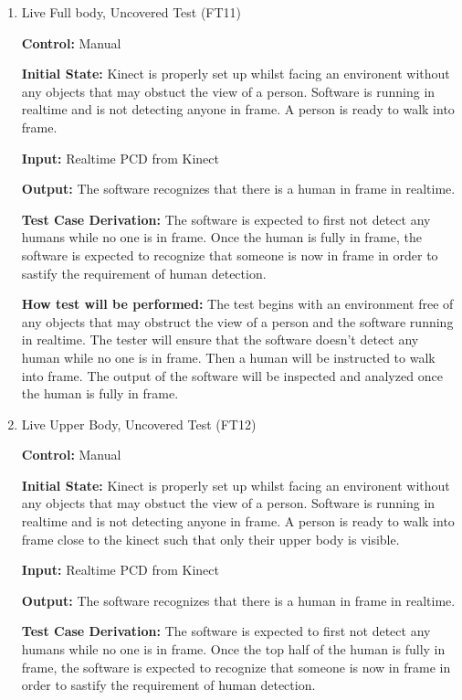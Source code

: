 \documentclass[12pt, titlepage]{article}
\begin{document}
\begin{enumerate}

\item{Live Full body, Uncovered Test (FT11) \label{FT11}\\}

\textbf{Control:} Manual
					
\textbf{Initial State:} Kinect is properly set up whilst facing an environent without any objects that may obstuct the view of a person. Software is running in realtime and is not detecting anyone in frame. A person is ready to walk into frame.
					
\textbf{Input:} Realtime PCD from Kinect
					
\textbf{Output:} The software recognizes that there is a human in frame in realtime.

\textbf{Test Case Derivation:} The software is expected to first not detect any humans while no one is in frame. Once the human is fully in frame, the software is expected to recognize that someone is now in frame in order to sastify the requirement of human detection.
					
\textbf{How test will be performed:} The test begins with an environment free of any objects that may obstruct the view of a person and the software running in realtime. The tester will ensure that the software doesn't detect any human while no one is in frame. Then a human will be instructed to walk into frame. The output of the software will be inspected and analyzed once the human is fully in frame. 
					
\item{Live Upper Body, Uncovered Test (FT12)\label{FT12}\\}

\textbf{Control:} Manual
					
\textbf{Initial State:} Kinect is properly set up whilst facing an environent without any objects that may obstuct the view of a person. Software is running in realtime and is not detecting anyone in frame. A person is ready to walk into frame close to the kinect such that only their upper body is visible.
					
\textbf{Input:} Realtime PCD from Kinect
			
\textbf{Output:} The software recognizes that there is a human in frame in realtime.

\textbf{Test Case Derivation:} The software is expected to first not detect any humans while no one is in frame. Once the top half of the human is fully in frame, the software is expected to recognize that someone is now in frame in order to sastify the requirement of human detection.
					

\end{enumerate}
\end{document}
